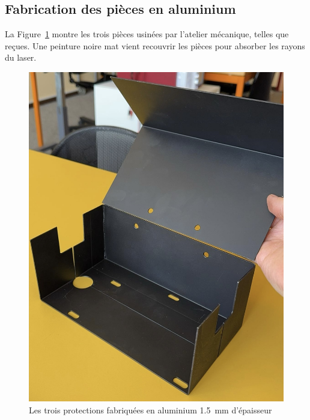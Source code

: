 \subsection{Fabrication des pièces en aluminium}
\begin{minipage}{\textwidth}

    \begin{minipage}[c]{0.6\textwidth}
        La Figure~\ref{capots_brutes} montre les trois pièces usinées par l'atelier mécanique, telles que reçues. Une peinture noire mat vient recouvrir les pièces pour absorber les rayons du laser.
    \end{minipage}\hfill
    \begin{minipage}[c]{0.35\textwidth}
        \begin{figure}[H]
            \centering
            \includegraphics[width=\textwidth]{assets/figures/Protections_laser/Securite_mecanique/Protection_entree_laser/capots_brutes.jpg}
            \caption{Les trois protections fabriquées en aluminium 1.5~mm d'épaisseur}
            \label{capots_brutes}
        \end{figure}
    \end{minipage}
\end{minipage}


